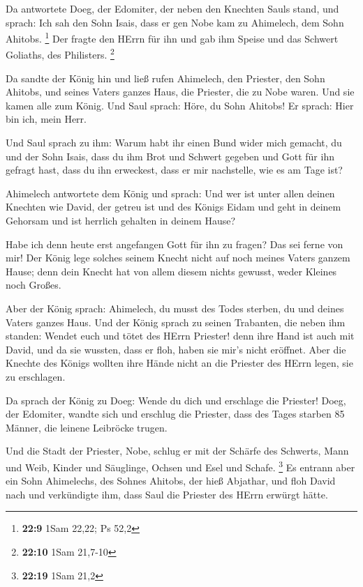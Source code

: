  Da antwortete Doeg, der Edomiter, der neben den Knechten
Sauls stand, und sprach: Ich sah den Sohn Isais, dass er gen Nobe kam zu
Ahimelech, dem Sohn Ahitobs. \footnote{\textbf{22:9} 1Sam 22,22; Ps 52,2}
 Der fragte den HErrn für ihn und gab ihm Speise und das
Schwert Goliaths, des Philisters. \footnote{\textbf{22:10} 1Sam 21,7-10}

 Da sandte der König hin und ließ rufen Ahimelech, den
Priester, den Sohn Ahitobs, und seines Vaters ganzes Haus, die Priester,
die zu Nobe waren. Und sie kamen alle zum König.  Und Saul
sprach: Höre, du Sohn Ahitobs! Er sprach: Hier bin ich, mein Herr.

 Und Saul sprach zu ihm: Warum habt ihr einen Bund wider
mich gemacht, du und der Sohn Isais, dass du ihm Brot und Schwert
gegeben und Gott für ihn gefragt hast, dass du ihn erweckest, dass er
mir nachstelle, wie es am Tage ist?

 Ahimelech antwortete dem König und sprach: Und wer ist
unter allen deinen Knechten wie David, der getreu ist und des Königs
Eidam und geht in deinem Gehorsam und ist herrlich gehalten in deinem
Hause?

 Habe ich denn heute erst angefangen Gott für ihn zu
fragen? Das sei ferne von mir! Der König lege solches seinem Knecht
nicht auf noch meines Vaters ganzem Hause; denn dein Knecht hat von
allem diesem nichts gewusst, weder Kleines noch Großes.

 Aber der König sprach: Ahimelech, du musst des Todes
sterben, du und deines Vaters ganzes Haus.  Und der König
sprach zu seinen Trabanten, die neben ihm standen: Wendet euch und tötet
des HErrn Priester! denn ihre Hand ist auch mit David, und da sie
wussten, dass er floh, haben sie mir's nicht eröffnet. Aber die Knechte
des Königs wollten ihre Hände nicht an die Priester des HErrn legen, sie
zu erschlagen.

 Da sprach der König zu Doeg: Wende du dich und erschlage
die Priester! Doeg, der Edomiter, wandte sich und erschlug die Priester,
dass des Tages starben 85 Männer, die leinene Leibröcke trugen.

 Und die Stadt der Priester, Nobe, schlug er mit der
Schärfe des Schwerts, Mann und Weib, Kinder und Säuglinge, Ochsen und
Esel und Schafe. \footnote{\textbf{22:19} 1Sam 21,2}  Es
entrann aber ein Sohn Ahimelechs, des Sohnes Ahitobs, der hieß Abjathar,
und floh David nach  und verkündigte ihm, dass Saul die
Priester des HErrn erwürgt hätte.

